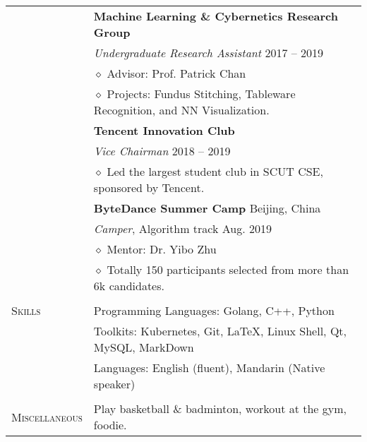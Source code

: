 \documentclass[letterpaper, 11pt]{article}
\begin{document}
\begin{longtable}{p{1in}p{5in}}
& \textbf{Machine Learning \& Cybernetics Research Group} \\
& \textit{Undergraduate Research Assistant} \hfill 2017 -- 2019 \\
& $\diamond$ Advisor: Prof. Patrick Chan \\
& $\diamond$ Projects: Fundus Stitching, Tableware Recognition, and NN Visualization. \\

& \textbf{Tencent Innovation Club} \\
& \textit{Vice Chairman} \hfill 2018 -- 2019 \\
& $\diamond$ Led the largest student club in SCUT CSE, sponsored by Tencent. \\

& \textbf{ByteDance Summer Camp} \hfill Beijing, China \\
& \textit{Camper}, Algorithm track \hfill Aug. 2019 \\
& $\diamond$ Mentor: Dr. Yibo Zhu \\
& $\diamond$ Totally 150 participants selected from more than 6k candidates. \\


& \\

\nohyphens{\textsc{Skills}}
& Programming Languages: Golang, C++, Python  \\
& Toolkits: Kubernetes, Git, \LaTeX, Linux Shell, Qt, MySQL, MarkDown \\
& Languages: English (fluent), Mandarin (Native speaker) \\
& \\


\nohyphens{\textsc{Miscellaneous}}
& Play basketball \& badminton, workout at the gym, foodie. \\


\end{longtable}
\end{document}
